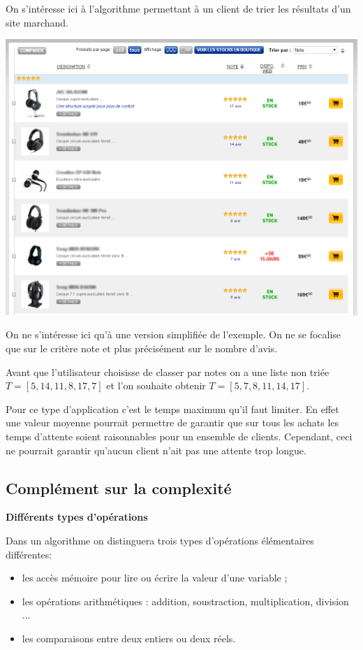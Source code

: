 \begin{exemple2}

On s'intéresse ici à l'algorithme permettant à un client de trier les résultats d'un site marchand.

\begin{center}
\includegraphics[width=.8\textwidth]{images/illustration.png}
\end{center}

On ne s'intéresse ici qu'à une version simplifiée de l'exemple. On ne se focalise que sur le critère note et plus précisément sur le nombre d'avis.

Avant que l'utilisateur choisisse de classer par notes on a une liste non triée $T=[5,14,11,8,17,7]$ et l'on souhaite obtenir $T=[5,7,8,11,14,17]$.

Pour ce type d'application c'est le temps maximum qu'il faut limiter. En effet une valeur moyenne pourrait permettre de garantir que sur tous les achats les temps d'attente soient raisonnables pour un ensemble de clients. Cependant, ceci ne pourrait garantir qu'aucun client n'ait pas une attente trop longue.

\end{exemple2}



\subsection{Complément sur la complexité}

\begin{prop}\textbf{Différents types d'opérations}

Dans un algorithme on distinguera trois types d'opérations élémentaires différentes:

\begin{itemize}
\item les accès mémoire pour lire ou écrire la valeur d'une variable ;
\item les opérations arithmétiques : addition, soustraction,
multiplication, division ...
\item les comparaisons entre deux entiers ou deux réels.
\end{itemize}

\end{prop}

